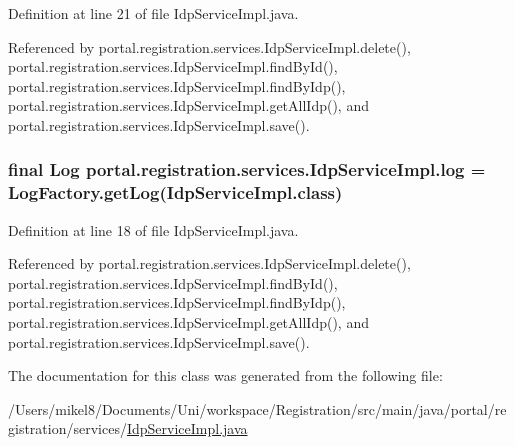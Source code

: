 Definition at line 21 of file IdpServiceImpl.java.



Referenced by portal.registration.services.IdpServiceImpl.delete(), portal.registration.services.IdpServiceImpl.findById(), portal.registration.services.IdpServiceImpl.findByIdp(), portal.registration.services.IdpServiceImpl.getAllIdp(), and portal.registration.services.IdpServiceImpl.save().

\hypertarget{classportal_1_1registration_1_1services_1_1IdpServiceImpl_a2aff21e86d4ff71dd5070a6d5ec1107e}{
\subsubsection[{log}]{\setlength{\rightskip}{0pt plus 5cm}final Log {\bf portal.registration.services.IdpServiceImpl.log} = LogFactory.getLog(IdpServiceImpl.class)}}
\label{classportal_1_1registration_1_1services_1_1IdpServiceImpl_a2aff21e86d4ff71dd5070a6d5ec1107e}


Definition at line 18 of file IdpServiceImpl.java.



Referenced by portal.registration.services.IdpServiceImpl.delete(), portal.registration.services.IdpServiceImpl.findById(), portal.registration.services.IdpServiceImpl.findByIdp(), portal.registration.services.IdpServiceImpl.getAllIdp(), and portal.registration.services.IdpServiceImpl.save().



The documentation for this class was generated from the following file:\begin{DoxyCompactItemize}
\item 
/Users/mikel8/Documents/Uni/workspace/Registration/src/main/java/portal/registration/services/\hyperlink{IdpServiceImpl_8java}{IdpServiceImpl.java}\end{DoxyCompactItemize}
